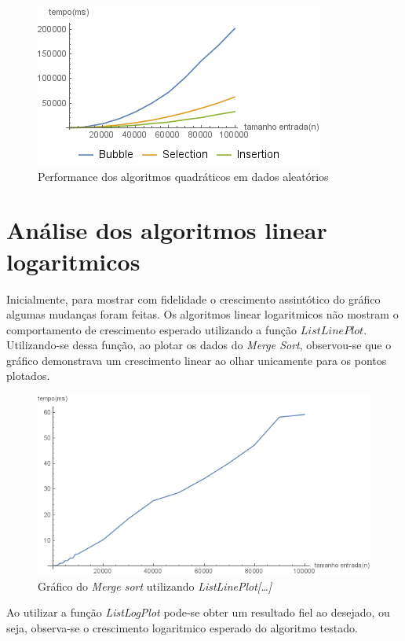 \documentclass[a4paper, 12pt]{report}
\begin{document}
\begin{figure}[htb]
\centering
\includegraphics[width=.9\linewidth]{./img/quadratic_random.png}
\caption{\small Performance dos algoritmos quadráticos em dados aleatórios}
\end{figure}

\chapter{Análise dos algoritmos linear logaritmicos}
\label{sec-4-2}
Inicialmente, para mostrar com fidelidade o crescimento assintótico do gráfico
algumas mudanças foram feitas. Os algoritmos linear logaritmicos não mostram o
comportamento de crescimento esperado utilizando a função $ListLinePlot$.
Utilizando-se dessa função, ao plotar os dados do \emph{Merge Sort}, observou-se
que o gráfico demonstrava um crescimento linear ao olhar unicamente para os
pontos plotados.

\begin{figure}[htb]
\centering
\includegraphics[width=.9\linewidth]{./img/old_merge_random.png}
\caption{Gráfico do \emph{Merge sort} utilizando \emph{ListLinePlot[\ldots{}]}}
\end{figure}

Ao utilizar a função \emph{ListLogPlot} pode-se obter um resultado fiel ao desejado,
ou seja, observa-se o crescimento logaritmico esperado do algoritmo testado.
\end{document}
